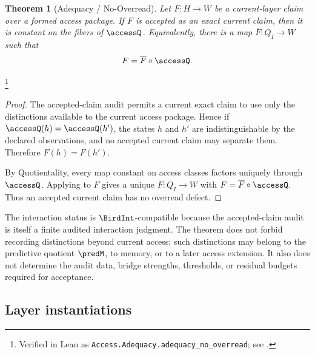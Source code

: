 \documentclass[11pt]{article}
\newtheorem{theorem}{Theorem}[section]
\theoremstyle{definition}
\begin{document}
\begin{theorem}[Adequacy / No-Overread]\label{thm:F11}
Let \(F:H\to W\) be a current-layer claim over a formed access
package.  If \(F\) is accepted as an exact current claim, then it is
constant on the fibers of \(\accessQ\).  Equivalently, there is a map
\(\overline F:Q_I\to W\) such that
\[
  F=\overline F\circ\accessQ .
\]
\end{theorem}
\footnote{Verified in Lean as
\texttt{Access.Adequacy.adequacy\_no\_overread}; see
.}
\begin{proof}
The accepted-claim audit permits a current exact claim to use only
the distinctions available to the current access package.  Hence if
\(\accessQ(h)=\accessQ(h')\), the states \(h\) and \(h'\) are
indistinguishable by the declared observations, and no accepted
current claim may separate them.  Therefore \(F(h)=F(h')\).

By Quotientality, every map constant on access classes factors
uniquely through \(\accessQ\).  Applying  to \(F\)
gives a unique \(\overline F:Q_I\to W\) with
\(F=\overline F\circ\accessQ\).  Thus an accepted current claim has
no overread defect.
\end{proof}

The interaction status is \(\BirdInt\)-compatible because the
accepted-claim audit is itself a finite audited interaction
judgment.  The theorem does not forbid recording distinctions beyond
current access; such distinctions may belong to the predictive
quotient \(\predM\), to memory, or to a later access extension.  It
also does not determine the audit data, bridge strengths, thresholds,
or residual budgets required for acceptance.

\subsection*{Layer instantiations}\label{layer-inst:F11}
\end{document}
